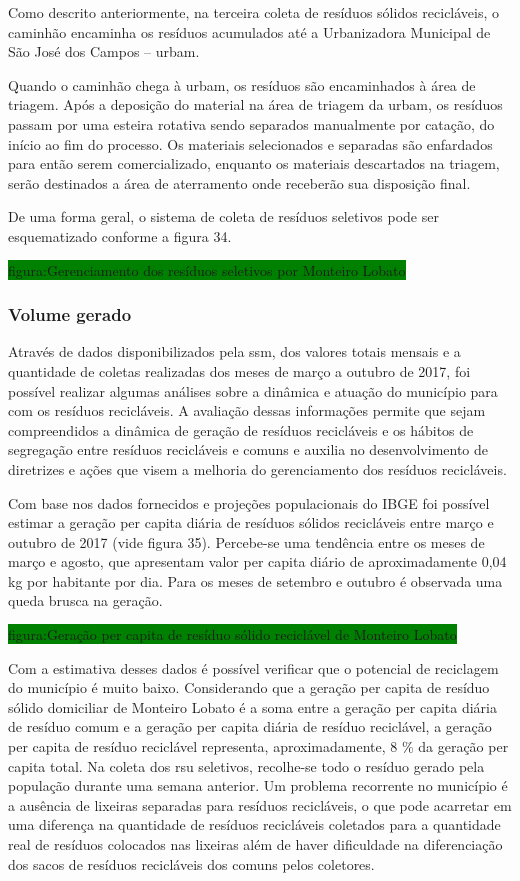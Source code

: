 	Como descrito anteriormente, na terceira coleta de resíduos sólidos recicláveis, o caminhão encaminha os resíduos acumulados até a Urbanizadora Municipal de São José dos Campos – \gls{urbam}.
	
	Quando o caminhão chega à \gls{urbam}, os resíduos são encaminhados à área de triagem. Após a deposição do material na área de triagem da \gls{urbam}, os resíduos passam por uma esteira rotativa sendo separados manualmente por catação, do início ao fim do processo. Os materiais selecionados e separadas são enfardados para então serem comercializado, enquanto os materiais descartados na triagem, serão destinados a área de aterramento onde receberão sua disposição final.
	
	De uma forma geral, o sistema de coleta de resíduos seletivos pode ser esquematizado conforme a figura 34.
	
	\colorbox{green}{figura:Gerenciamento dos resíduos seletivos por Monteiro Lobato}
	
	\subsubsection{Volume gerado}
	
	Através de dados disponibilizados pela \gls{ssm}, dos valores totais mensais e a quantidade de coletas realizadas dos meses de março a outubro de 2017, foi possível realizar algumas análises sobre a dinâmica e atuação do município para com os resíduos recicláveis. A avaliação dessas informações permite que sejam compreendidos a dinâmica de geração de resíduos recicláveis e os hábitos de segregação entre resíduos recicláveis e comuns e auxilia no desenvolvimento de diretrizes e ações que visem a melhoria do gerenciamento dos resíduos recicláveis.
	
	Com base nos dados fornecidos e projeções populacionais do IBGE foi possível estimar a geração per capita diária de resíduos sólidos recicláveis entre março e outubro de 2017 (vide figura 35). Percebe-se uma tendência entre os meses de março e agosto, que apresentam valor per capita diário de aproximadamente 0,04 kg por habitante por dia. Para os meses de setembro e outubro é observada uma queda brusca na geração.
	
	\colorbox{green}{figura:Geração per capita de resíduo sólido reciclável de Monteiro Lobato}
	
	Com a estimativa desses dados é possível verificar que o potencial de reciclagem do município é muito baixo. Considerando que a geração per capita de resíduo sólido domiciliar de Monteiro Lobato é a soma entre a geração per capita diária de resíduo comum e a geração per capita diária de resíduo reciclável, a geração per capita de resíduo reciclável representa, aproximadamente, 8 \% da geração per capita total.
	Na coleta dos \gls{rsu} seletivos, recolhe-se todo o resíduo gerado pela população durante uma semana anterior. Um problema recorrente no município é a ausência de lixeiras separadas para resíduos recicláveis, o que pode acarretar em uma diferença na quantidade de resíduos recicláveis coletados para a quantidade real de resíduos colocados nas lixeiras além de haver dificuldade na diferenciação dos sacos de resíduos recicláveis dos comuns pelos coletores.
	
